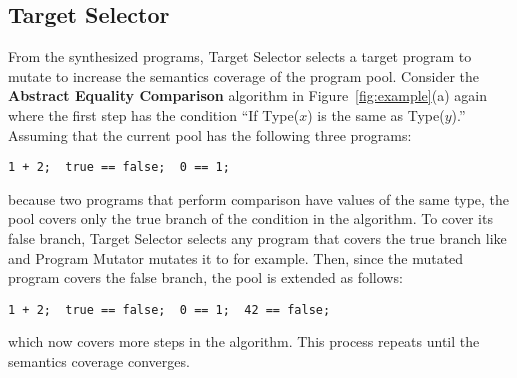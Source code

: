 \subsection{Target Selector}
From the synthesized programs, \textsf{Target Selector} selects a
target program to mutate to increase the semantics coverage of the
program pool.  Consider the \textbf{Abstract Equality Comparison} algorithm 
in Figure~\ref{fig:example}(a) again where the first step has the condition
``If Type($x$) is the same as Type($y$).'' Assuming that the current pool
has the following three programs:
\begin{lstlisting}[style=myJSstyle]
           1 + 2;  true == false;  0 == 1;
\end{lstlisting}
because two programs that perform comparison have values of the same type,
the pool covers only the true branch of the condition in the algorithm.
To cover its false branch, \textsf{Target Selector} selects any program
that covers the true branch like  and \textsf{Program Mutator}
mutates it to  for example.  Then, since the mutated
program covers the false branch, the pool is extended as follows:
\begin{lstlisting}[style=myJSstyle]
   1 + 2;  true == false;  0 == 1;  42 == false;
\end{lstlisting}
which now covers more steps in the algorithm.
This process repeats until the semantics coverage converges.
